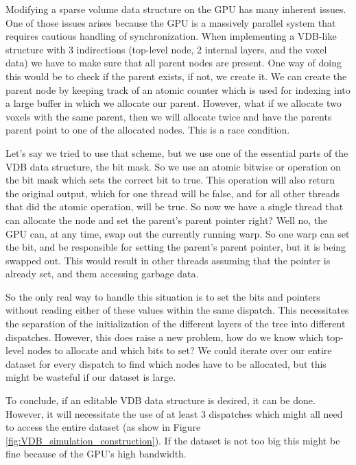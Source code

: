 Modifying a sparse volume data structure on the GPU has many inherent issues. One of those issues arises because the GPU is a massively parallel system that requires cautious handling of synchronization. When implementing a VDB-like structure with 3 indirections (top-level node, 2 internal layers, and the voxel data) we have to make sure that all parent nodes are present. One way of doing this would be to check if the parent exists, if not, we create it. We can create the parent node by keeping track of an atomic counter which is used for indexing into a large buffer in which we allocate our parent. However, what if we allocate two voxels with the same parent, then we will allocate twice and have the parents parent point to one of the allocated nodes. This is a race condition.

Let's say we tried to use that scheme, but we use one of the essential parts of the VDB data structure, the bit mask. So we use an atomic bitwise or operation on the bit mask which sets the correct bit to true. This operation will also return the original output, which for one thread will be false, and for all other threads that did the atomic operation, will be true. So now we have a single thread that can allocate the node and set the parent's parent pointer right? Well no, the GPU can, at any time, swap out the currently running warp. So one warp can set the bit, and be responsible for setting the parent's parent pointer, but it is being swapped out. This would result in other threads assuming that the pointer is already set, and them accessing garbage data.

So the only real way to handle this situation is to set the bits and pointers without reading either of these values within the same dispatch. This necessitates the separation of the initialization of the different layers of the tree into different dispatches. However, this does raise a new problem, how do we know which top-level nodes to allocate and which bits to set? We could iterate over our entire dataset for every dispatch to find which nodes have to be allocated, but this might be wasteful if our dataset is large.

To conclude, if an editable VDB data structure is desired, it can be done. However, it will necessitate the use of at least 3 dispatches which might all need to access the entire dataset (as show in Figure \ref{fig:VDB_simulation_construction}). If the dataset is not too big this might be fine because of the GPU's high bandwidth.


